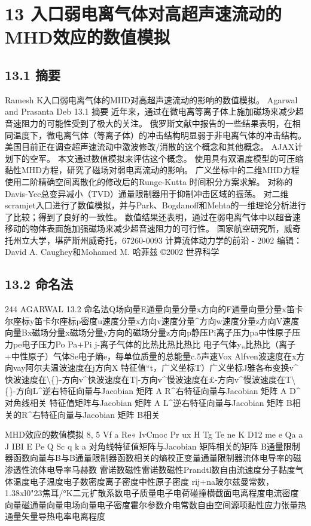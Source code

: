\documentclass[UTF8,11pt,a4paper,openany,fontset=fandol]{ctexbook}
\begin{document}
\clearpage
\chapter{13 入口弱电离气体对高超声速流动的MHD效应的数值模拟}
\section{13.1 摘要}
Ramesh K入口弱电离气体的MHD对高超声速流动的影响的数值模拟。 Agarwal and Prasanta Deb 13.1 摘要 近年来，通过在微电离等离子体上施加磁场来减少超音速阻力的可能性受到了极大的关注。 俄罗斯文献中报告的一些结果表明，在相同温度下，微电离气体（等离子体）的冲击结构明显弱于非电离气体的冲击结构。 美国目前正在调查超声速流动中激波修改/消散的这个概念和其他概念。 AJAX计划下的空军。 本文通过数值模拟来评估这个概念。 使用具有双温度模型的可压缩黏性MHD方程，研究了磁场对弱电离流动的影响。 广义坐标中的二维MHD方程使用二阶精确空间离散化的修改后的Runge-Kutta 时间积分方案求解。 对称的Davis-Yee总变异减小（TVD）通量限制器用于抑制冲击区域的振荡。 对二维scramjet入口进行了数值模拟，并与Park、Bogdanoff和Mehta的一维理论分析进行了比较；得到了良好的一致性。 数值结果还表明，通过在弱电离气体中以超音速移动的物体表面施加强磁场来减少超音速阻力的可行性。 国家航空研究所，威奇托州立大学，堪萨斯州威奇托，67260-0093 计算流体动力学的前沿 - 2002 编辑：David A. Caughey和Mohamed M. 哈菲兹 ©2002 世界科学

\section{13.2 命名法}
244 AGARWAL 13.2 命名法Q场向量E通量向量分量x方向的F通量向量分量x笛卡尔座标y笛卡尔座标p密度u速度分量x方向v速度分量\textasciicircum{}方向w速度分量z方向V速度向量Bx磁场分量x磁场分量y方向的磁场分量z方向p静压Pi离子压力pa中性原子压力pe电子压力Po Pa+Pi j-离子气体的比热比热比热比 电子气体y„比热比（离子+中性原子）气体Se电子熵e，每单位质量的总能量c.5声速Vox Alfven波速度在x方向vay阿尔夫温波速度在j方向X 特征值“t，广义坐标T）广义坐标J雅各布变换v\textasciicircum{}快波速度在\textbackslash\{\}-方向v\textasciicircum{}快波速度在T|-方向v\textasciicircum{}慢波速度在£-方向v\textasciicircum{}慢波速度在T\textbackslash\{\}-方向L\textasciicircum{}逆右特征向量与Jacobian 矩阵 A R\textasciicircum{}右特征向量与Jacobian 矩阵 A D\textasciicircum{}对角线相关 特征值矩阵与Jacobian 矩阵 A L\textasciicircum{}逆右特征向量与Jacobian 矩阵 B相关的R\textasciicircum{}右特征向量与Jacobian 矩阵 B相关

MHD效应的数值模拟 8, 5 Vf a Re« IvCmoc Pr ux H Tg Te ne K D12 me e Qa a J IBI E Pe Q Sc q k a 对角线特征值矩阵与Jacobian 矩阵相关的矩阵 B通量限制器函数向量与B与B通量限制器函数相关的熵校正变量通量限制器流体电导率的磁渗透性流体电导率马赫数 雷诺数磁性雷诺数磁性Prandtl数自由流速度分子黏度气体温度电子温度电子数密度离子密度中性原子密度 rij+na玻尔兹曼常数，1.38xl0"23焦耳/°K二元扩散系数电子质量电子电荷碰撞横截面电离程度电流密度向量磁通量向量电场向量电子密度霍尔参数介电常数自由空间源项黏性应力张量热通量矢量导热电率电离程度
\end{document}
